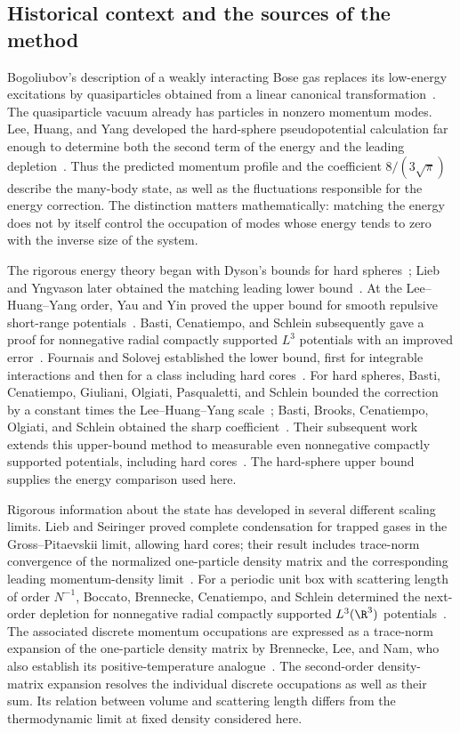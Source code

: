 \subsection{Historical context and the sources of the method}

Bogoliubov's description of a weakly interacting Bose gas replaces its
low-energy excitations by quasiparticles obtained from a linear canonical
transformation~\cite{Bogoliubov}. The quasiparticle vacuum already has
particles in nonzero momentum modes. Lee, Huang, and Yang developed the
hard-sphere pseudopotential calculation far enough to determine both the
second term of the energy and the leading depletion~\cite{LHY}. Thus the
predicted momentum profile and the coefficient $8/(3\sqrt\pi)$ describe
the many-body state, as well as the fluctuations responsible for the
energy correction. The distinction matters mathematically: matching
the energy does not by itself control the occupation of modes whose
energy tends to zero with the inverse size of the system.

The rigorous energy theory began with Dyson's bounds for hard
spheres~\cite{Dyson}; Lieb and Yngvason later obtained the matching
leading lower bound~\cite{LY}. At the Lee--Huang--Yang order, Yau and
Yin proved the upper bound for smooth repulsive short-range
potentials~\cite{YY}. Basti, Cenatiempo, and Schlein subsequently gave
a proof for nonnegative radial compactly supported $L^3$ potentials
with an improved error~\cite{BCS2021}. Fournais and Solovej established
the lower bound, first for integrable interactions and then for a class
including hard cores~\cite{FS2020,FS2023}. For hard spheres, Basti,
Cenatiempo, Giuliani, Olgiati, Pasqualetti, and Schlein bounded the
correction by a constant times the Lee--Huang--Yang scale~\cite{BCGOPS};
Basti, Brooks, Cenatiempo, Olgiati, and Schlein obtained the sharp
coefficient~\cite{BBCOS}. Their subsequent work extends this upper-bound
method to measurable even nonnegative compactly supported potentials,
including hard cores~\cite{BBCOSgeneral}.
The hard-sphere upper bound supplies the energy comparison used here.

Rigorous information about the state has developed in several different
scaling limits. Lieb and Seiringer proved complete condensation for
trapped gases in the Gross--Pitaevskii limit, allowing hard cores; their
result includes trace-norm convergence of the normalized one-particle
density matrix and the corresponding leading momentum-density
limit~\cite{LS2002}. For a periodic unit box with scattering length of
order $N^{-1}$, Boccato, Brennecke, Cenatiempo, and Schlein determined
the next-order depletion for nonnegative radial compactly supported
$L^3(\R^3)$ potentials~\cite[Equation~(1.14) and Appendix~A]{BBCS}.
The associated discrete momentum occupations are expressed as a
trace-norm expansion of the one-particle density matrix by Brennecke,
Lee, and Nam, who also establish its positive-temperature
analogue~\cite[Equations~(6)--(8) and Theorem~1.1]{BLN}.
The second-order density-matrix expansion resolves the individual
discrete occupations as well as their sum. Its relation between volume
and scattering length differs from the thermodynamic limit at fixed
density considered here.

